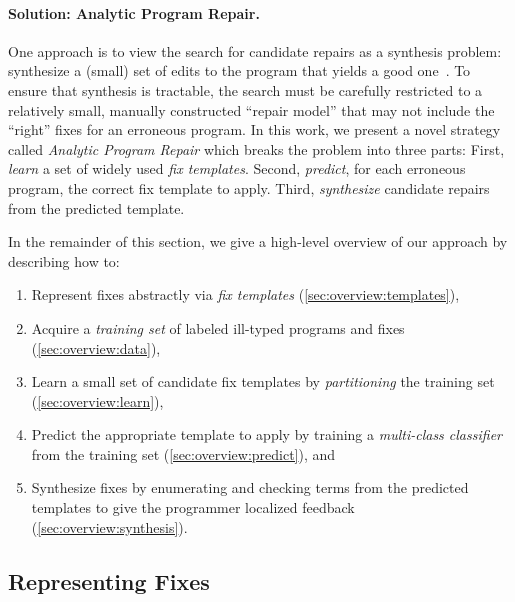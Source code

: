 \paragraph{Solution: Analytic Program Repair.}
%
One approach is to view the search for candidate repairs as a synthesis problem:
synthesize a (small) set of edits to the program that yields a good
one~\cite{singh2013}. %
%
To ensure that synthesis is tractable, the search must be carefully restricted
to a relatively small, manually constructed ``repair model'' that may not
include the ``right'' fixes for an erroneous program.
%
In this work, we present a novel strategy called \emph{Analytic Program Repair}
which breaks the problem into three parts:
%
First, \emph{learn} a set of widely used \emph{fix templates}.
%
Second, \emph{predict}, for each erroneous program, the correct fix template
to apply.
%
Third, \emph{synthesize} candidate repairs from the predicted template.

In the remainder of this section, we give a high-level overview of our approach
by describing how to:

\begin{enumerate}

  \item Represent fixes abstractly via \emph{fix templates}
        (\autoref{sec:overview:templates}),

  \item Acquire a \emph{training set} of labeled ill-typed programs and fixes
        (\autoref{sec:overview:data}),

  \item Learn a small set of candidate fix templates by \emph{partitioning}
        the training set (\autoref{sec:overview:learn}),

  \item Predict the appropriate template to apply by training a
        \emph{multi-class classifier} from the training set
        (\autoref{sec:overview:predict}), and

  \item Synthesize fixes by enumerating and checking terms from the
        predicted templates to give the programmer localized feedback
        (\autoref{sec:overview:synthesis}).
\end{enumerate}

\subsection{Representing Fixes}
\label{sec:overview:templates}

